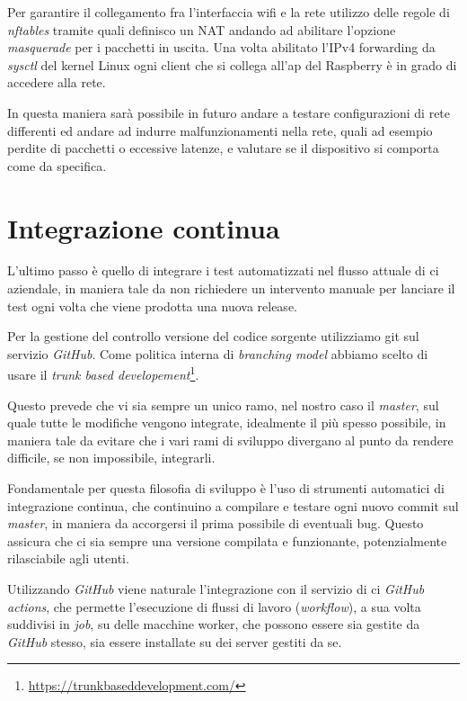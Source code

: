 \documentclass[12pt,a4paper,twoside,titlepage]{book}
\begin{document}
Per garantire il collegamento fra l'interfaccia \Gls{wifi} e la rete utilizzo delle 
regole di \textit{nftables} tramite quali definisco un NAT andando ad abilitare l'opzione
\textit{masquerade} per i pacchetti in uscita. Una volta abilitato l'IPv4
forwarding da \textit{sysctl} del kernel Linux ogni client che si collega all'\acrshort{ap}
del Raspberry è in grado di accedere alla rete. 

In questa maniera sarà possibile in futuro andare a testare configurazioni
di rete differenti ed andare ad indurre malfunzionamenti nella rete, quali ad esempio
perdite di pacchetti o eccessive latenze, e valutare se il dispositivo si comporta come
da specifica.

\section{Integrazione continua}

L'ultimo passo è quello di integrare i test automatizzati nel flusso attuale 
di \acrfull{ci} aziendale, in maniera tale da non richiedere 
un intervento manuale per lanciare il test ogni volta che viene prodotta una nuova release. 

Per la gestione del controllo versione del codice sorgente utilizziamo \Gls{git}
sul servizio \textit{GitHub}. Come politica interna di 
\textit{branching model} abbiamo scelto di usare il \textit{trunk based developement}\footnote{\url{https://trunkbaseddevelopment.com/}}. 

Questo prevede che vi sia sempre un unico ramo, nel nostro caso il \textit{master}, sul 
quale tutte le modifiche vengono integrate, idealmente il più spesso possibile, in 
maniera tale da evitare che i vari rami di sviluppo divergano al punto da rendere difficile,
se non impossibile, integrarli.

Fondamentale per questa filosofia di sviluppo è l'uso di strumenti automatici di integrazione continua,
che continuino a compilare e testare ogni nuovo commit sul \textit{master}, in maniera 
da accorgersi il prima possibile di eventuali bug. Questo assicura che 
ci sia sempre una versione compilata e funzionante, potenzialmente rilasciabile agli utenti. 

Utilizzando \textit{GitHub} viene naturale l'integrazione con il servizio di \acrshort{ci} 
\textit{GitHub actions}, che permette l'esecuzione di flussi di lavoro (\textit{workflow}), 
a sua volta suddivisi in \textit{job}, su delle macchine worker, che possono essere sia 
gestite da \textit{GitHub} stesso, sia essere installate su dei server gestiti da se. 
\end{document}

